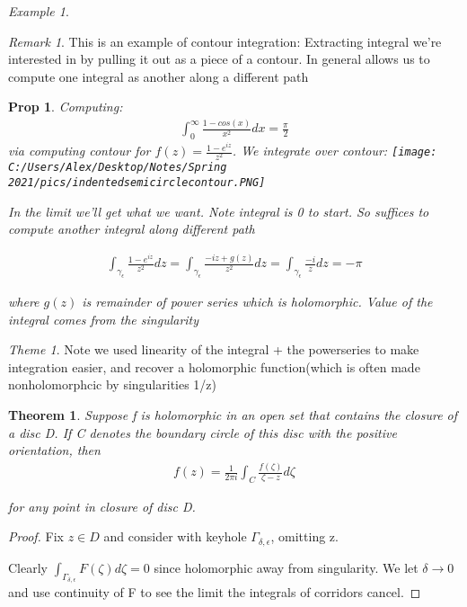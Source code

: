 \documentclass[11pt]{article}
\newtheorem{theorem}{Theorem}
\newtheorem{prop}{Prop}
\theoremstyle{remark}
\newtheorem{remark}{Remark}
\newtheorem{theme}{Theme}
\newtheorem{example}{Example}
\begin{document}
\begin{example}
\begin{remark}
	This is an example of contour integration: Extracting integral we're interested in by pulling it out as a piece of a contour. In general allows us to compute one integral as another along a different path
\end{remark}

\begin{prop}
	Computing:
	\begin{align*}
		\int_0^{\infty} \frac{1-cos(x)}{x^2}dx = \frac{\pi}{2}
	\end{align*}
	via computing contour for $f(z) = \frac{1-e^{iz}}{z^2}$. We integrate over contour:
	\texttt{[image: C:/Users/Alex/Desktop/Notes/Spring 2021/pics/indentedsemicirclecontour.PNG]}

	In the limit we'll get what we want. Note integral is 0 to start. So suffices to compute another integral along different path

	\begin{align*}
		\int_{\gamma_{\epsilon}} \frac{1-e^{iz}}{z^2}dz = \int_{\gamma_{\epsilon}} \frac{-iz + g(z)}{z^2}dz = \int_{\gamma_{\epsilon}} \frac{-i}{z}dz = - \pi
	\end{align*}

	where $g(z)$ is remainder of power series which is holomorphic. Value of the integral comes from the singularity
\end{prop}
\begin{theme}
	Note we used linearity of the integral + the powerseries to make integration easier, and recover a holomorphic function(which is often made nonholomorphcic by singularities 1/z)
\end{theme}

\begin{theorem}
	Suppose f is holomorphic in an open set that contains the closure of a disc D. If C denotes the boundary circle of this disc with the positive orientation, then
	\begin{align*}
		f(z) = \frac{1}{2 \pi i} \int_C \frac{f(\zeta)}{\zeta - z}d \zeta
	\end{align*}

	for any point in closure of disc D.
\end{theorem}

\begin{proof}
	Fix $z \in D$ and consider with keyhole $\Gamma_{\delta,\epsilon}$, omitting z. 

	Clearly $\int_{\Gamma_{\delta,\epsilon}} F(\zeta) d\zeta = 0$ since holomorphic away from singularity. We let $\delta \to 0$ and use continuity of F to see the limit the integrals of corridors cancel. 


\end{proof}
\end{example}
\end{document}
